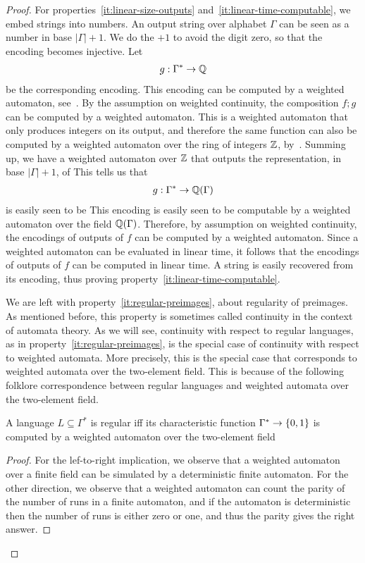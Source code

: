 \begin{proof}
    For properties~\ref{it:linear-size-outputs} and~\ref{it:linear-time-computable}, we embed strings into numbers. 
    An output string over alphabet $\Gamma$ can be seen as a number in base $|\Gamma|+1$. We do the $+1$ to avoid the digit zero, so that the encoding becomes injective. Let 
    \begin{align*}
    g : \Gamma^* \to {\mathbb Q}
    \end{align*} 
    be the corresponding encoding. This encoding can be computed by a weighted automaton, see~\cite[Lemma 8.10]{bojanczyk_automata_2025}. By  the assumption on weighted continuity, the composition $f;g$ can be computed by a weighted automaton. This is a weighted automaton that only produces integers on its output, and therefore the same function can also be computed by a weighted automaton over the ring of integers ${\mathbb Z}$, by~\cite[p. 110]{BerstelReutenauer08}. Summing up, we have a weighted automaton over ${\mathbb Z}$ that outputs the representation, in base $|\Gamma|+1$, of  This tells us that 
    \begin{align*}
    g : \Gamma^* \to {\mathbb Q}(\Gamma)
    \end{align*}
    is easily seen to be 
    This encoding is easily seen to be computable by a weighted automaton over the field ${\mathbb Q}(\Gamma)$. Therefore, by assumption on weighted continuity, the encodings of outputs of  $f$ can be computed by a weighted automaton. Since a weighted automaton can be evaluated in linear time, it follows that the encodings of outputs of $f$ can be computed in linear time. A string is easily recovered from its encoding, thus proving property~\ref{it:linear-time-computable}. 
    
    We are left with property~\ref{it:regular-preimages}, about regularity of preimages. As mentioned before, this property is sometimes called continuity in the context of automata theory. As we will see, continuity with respect to regular languages, as in property~\ref{it:regular-preimages}, is the special case of  continuity with respect to weighted automata. More precisely, this is the special case that corresponds to weighted automata over the two-element field.  This is because of  the following  folklore correspondence between regular languages and weighted automata over the two-element field. 
        
        \begin{claim}\label{claim:regular-weighted-automata}
            A language $L \subseteq \Gamma^*$ is regular iff its characteristic function $\Gamma^* \to \{0,1\}$ is computed by a weighted automaton over the two-element field 
        \end{claim}
        \begin{proof}
            For the lef-to-right implication, we observe that a weighted automaton over a finite field can be simulated by a deterministic finite automaton. For the other direction, we observe that a weighted automaton can count the parity of  the number of runs in a finite automaton, and if the automaton is deterministic then the number of runs is either zero or one, and thus the parity gives the right answer.
        \end{proof}


\end{proof}
